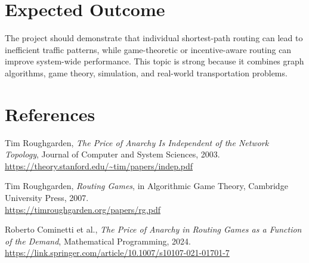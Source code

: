 \documentclass[11pt,a4paper]{article}
\begin{document}
\section{Expected Outcome}

The project should demonstrate that individual shortest-path routing can lead to inefficient traffic patterns, while game-theoretic or incentive-aware routing can improve system-wide performance. This topic is strong because it combines graph algorithms, game theory, simulation, and real-world transportation problems.

\section*{References}

\begin{enumerate}[label={[\arabic*]},leftmargin=2.2em]
    \item Tim Roughgarden, \textit{The Price of Anarchy Is Independent of the Network Topology}, Journal of Computer and System Sciences, 2003.\\
    \url{https://theory.stanford.edu/~tim/papers/indep.pdf}

    \item Tim Roughgarden, \textit{Routing Games}, in Algorithmic Game Theory, Cambridge University Press, 2007.\\
    \url{https://timroughgarden.org/papers/rg.pdf}

    \item Roberto Cominetti et al., \textit{The Price of Anarchy in Routing Games as a Function of the Demand}, Mathematical Programming, 2024.\\
    \url{https://link.springer.com/article/10.1007/s10107-021-01701-7}
\end{enumerate}
\end{document}
